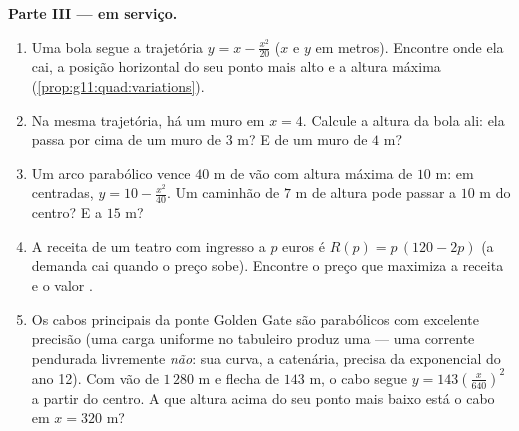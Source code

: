 \begin{problem}
\medskip
\noindent\textbf{Parte III ---  em serviço.}
\begin{enumerate}[resume]
  \item Uma bola segue a trajetória $y = x - \frac{x^2}{20}$
        ($x$ e $y$ em metros). Encontre onde ela cai, a posição
        horizontal do seu ponto mais alto e a altura máxima
        (\cref{prop:g11:quad:variations}).
  \item Na mesma trajetória, há um muro em $x = 4$. Calcule a
        altura da bola ali: ela passa por cima de um muro de
        $3$ m? E de um muro de $4$ m?
  \item Um arco parabólico vence $40$ m de vão com altura máxima
        de $10$ m: em  centradas,
        $y = 10 - \frac{x^2}{40}$. Um caminhão de $7$ m de altura
        pode passar a $10$ m do centro? E a $15$ m?
  \item A receita de um teatro com ingresso a $p$ euros é
        $R(p) = p\,(120 - 2p)$ (a demanda cai quando o preço
        sobe). Encontre o preço que maximiza a receita e o valor
        .
  \item Os cabos principais da ponte Golden Gate são parabólicos
        com excelente precisão (uma carga uniforme no tabuleiro
        produz uma  --- uma corrente pendurada livremente
        \emph{não}: sua curva, a catenária, precisa da
        exponencial do ano 12). Com vão de $1\,280$ m e flecha de
        $143$ m, o cabo segue
        $y = 143\left(\frac{x}{640}\right)^2$ a partir do
        centro. A que altura acima do seu ponto mais baixo está o
        cabo em $x = 320$ m?
\end{enumerate}


\end{problem}
